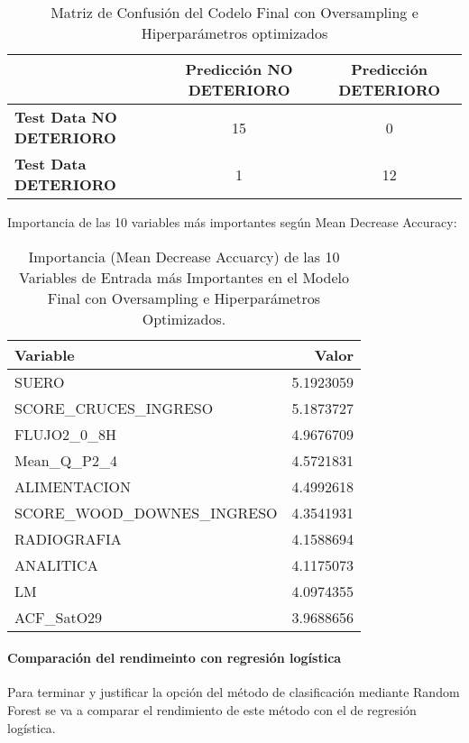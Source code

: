 \begin{table}[H]
    \centering
    \begin{tabular}{lcc}
        \toprule
        & \textbf{Predicción NO DETERIORO} & \textbf{Predicción DETERIORO} \\
        \midrule
        \textbf{Test Data NO DETERIORO} & 15 & 0 \\
        \textbf{Test Data DETERIORO} & 1 & 12 \\
        \bottomrule
    \end{tabular}
    \caption{Matriz de Confusión del Codelo Final con Oversampling e Hiperparámetros optimizados}
    \label{tabla:confusion_matrix_final_Hiper}
\end{table}


Importancia de las 10 variables más importantes según Mean Decrease Accuracy:

\begin{table}[H]
    \centering
    \begin{tabular}{|l|r|}
        \hline
        \textbf{Variable} & \textbf{Valor} \\
        \hline
        SUERO & 5.1923059 \\
        SCORE\_CRUCES\_INGRESO & 5.1873727 \\
        FLUJO2\_0\_8H & 4.9676709 \\
        Mean\_Q\_P2\_4 & 4.5721831 \\
        ALIMENTACION & 4.4992618 \\
        SCORE\_WOOD\_DOWNES\_INGRESO & 4.3541931 \\
        RADIOGRAFIA & 4.1588694 \\
        ANALITICA & 4.1175073 \\
        LM & 4.0974355 \\
        ACF\_SatO29 & 3.9688656 \\
        \hline
    \end{tabular}
    \caption{Importancia (Mean Decrease Accuarcy) de las 10 Variables de Entrada más Importantes en el Modelo Final con Oversampling e Hiperparámetros Optimizados.}
    \label{tabla:importancia_variables_modelo_final_Hiper}
\end{table}

\paragraph{Comparación del rendimeinto con regresión logística}

Para terminar y justificar la opción del método de clasificación mediante Random Forest se va a comparar el rendimiento de este método con el de regresión logística.

